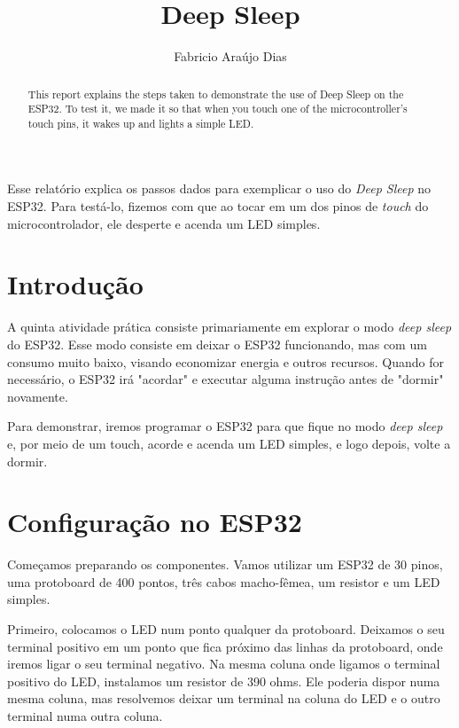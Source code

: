 \documentclass[12pt]{article}
\title{Deep Sleep}
\author{Fabricio Araújo Dias}
\begin{document}
 

\maketitle

\begin{abstract}
  This report explains the steps taken to demonstrate the use of Deep Sleep on the ESP32. To test it, we made it so that when you touch one of the microcontroller's touch pins, it wakes up and lights a simple LED.
\end{abstract}
     
\begin{resumo} 
  Esse relatório explica os passos dados para exemplicar o uso do \textit{Deep Sleep} no ESP32. Para testá-lo, fizemos com que ao tocar em um dos pinos de \textit{touch} do microcontrolador, ele desperte e acenda um LED simples.
\end{resumo}


\section{Introdução}\label{sec:introdução}
A quinta atividade prática consiste primariamente em explorar o modo \textit{deep sleep} do ESP32. Esse modo consiste em deixar o ESP32 funcionando, mas com um consumo muito baixo, visando economizar energia e outros recursos. Quando for necessário, o ESP32 irá "acordar" e executar alguma instrução antes de "dormir" novamente.

Para demonstrar, iremos programar o ESP32 para que fique no modo \textit{deep sleep} e, por meio de um touch, acorde e acenda um LED simples, e logo depois, volte a dormir.

\section{Configuração no ESP32}

Começamos preparando os componentes. Vamos utilizar um ESP32 de 30 pinos, uma protoboard de 400 pontos, três cabos macho-fêmea, um resistor e um LED simples.

Primeiro, colocamos o LED num ponto qualquer da protoboard. Deixamos o seu terminal positivo em um ponto que fica próximo das linhas da protoboard, onde iremos ligar o seu terminal negativo. Na mesma coluna onde ligamos o terminal positivo do LED, instalamos um resistor de 390 ohms. Ele poderia dispor numa mesma coluna, mas resolvemos deixar um terminal na coluna do LED e o outro terminal numa outra coluna.
\end{document}
